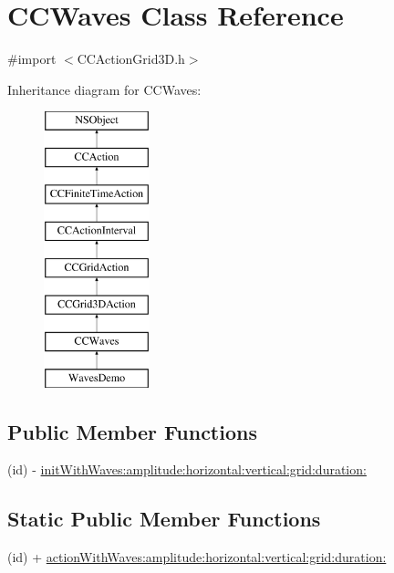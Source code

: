 \hypertarget{interface_c_c_waves}{\section{C\-C\-Waves Class Reference}
\label{interface_c_c_waves}
}


{\ttfamily \#import $<$C\-C\-Action\-Grid3\-D.\-h$>$}

Inheritance diagram for C\-C\-Waves\-:\begin{figure}[H]
\begin{center}
\leavevmode
\includegraphics[height=8.000000cm]{interface_c_c_waves}
\end{center}
\end{figure}
\subsection*{Public Member Functions}
\begin{DoxyCompactItemize}
\item 
(id) -\/ \hyperlink{interface_c_c_waves_a4205b35a5f1a8c0a9230f14eda485f12}{init\-With\-Waves\-:amplitude\-:horizontal\-:vertical\-:grid\-:duration\-:}
\end{DoxyCompactItemize}
\subsection*{Static Public Member Functions}
\begin{DoxyCompactItemize}
\item 
(id) + \hyperlink{interface_c_c_waves_a6fec83730f892b0d6036f946bda6d8bf}{action\-With\-Waves\-:amplitude\-:horizontal\-:vertical\-:grid\-:duration\-:}
\end{DoxyCompactItemize}
